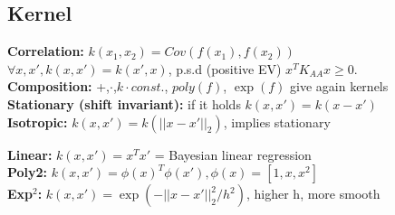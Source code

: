 \subsection{Kernel}
\textbf{Correlation:} $k(x_1, x_2) = Cov(f(x_1), f(x_2))$\\
$\forall x,x',k(x, x') = k(x', x)$, p.s.d (positive EV) $x^T K_{AA} x \geq 0$.\\
\textbf{Composition:} +,$\cdot$,$k\cdot const.$, $poly(f)$, $\exp(f)$ give again kernels\\
\textbf{Stationary (shift invariant):} if it holds $k(x,x') = k(x-x')$\\
\textbf{Isotropic:} $k(x,x') = k(||x-x'||_2)$, implies stationary\\
\begin{comment}
	After fitting to a sample point, the posterior is not isotropic, since the variance is decreased in the region of the sample.\\
\end{comment}

\textbf{Linear:} $k(x,x') = x^T x'$ = Bayesian linear regression\\
\textbf{Poly2:} $k(x,x') = \phi(x)^T \phi(x'), \phi(x) = [1, x, x^2]$\\
\textbf{Exp$^2$:} $k(x,x') = \exp(-||x - x'||_2^2 / h^2)$, higher h, more smooth \\
\begin{comment}
\textbf{Exp:} $k(x,x') = \exp(-||x - x'||_1 / h)$, decay with distance \\
	\textbf{Visual smoothness:} The bigger h is, the higher is the radius of influence. This means that the functions appear much smoother.\\
\end{comment} 